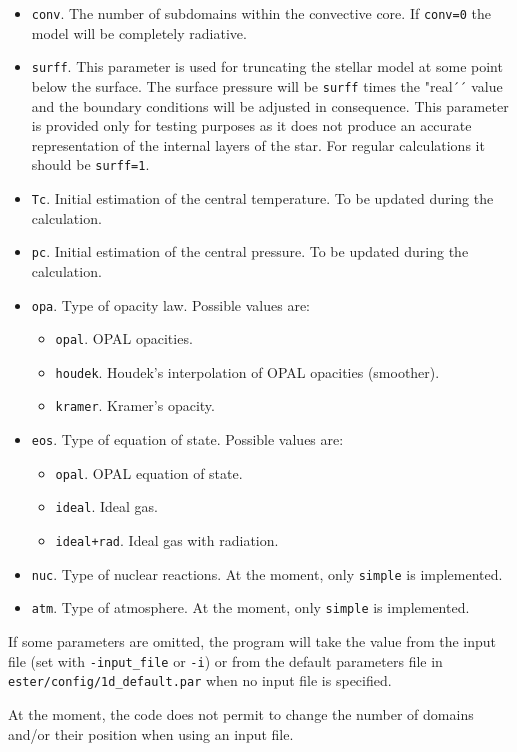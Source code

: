\begin{itemize}
$$\begin{array}{ll}
\end{array}\right.$$
If there is no convective core, this parameter is ignored.
\item {\tt conv}. The number of subdomains within the convective core. If {\tt conv=0} the
model will be completely radiative.
\item {\tt surff}. This parameter is used for truncating the stellar model at some point 
below the surface. The surface pressure will be {\tt surff} times the "real´´ value and
the boundary conditions will be adjusted in consequence. This parameter is provided only for
testing purposes as it does not produce an accurate representation of the internal layers
of the star. For regular calculations it should be {\tt surff=1}.
\item {\tt Tc}. Initial estimation of the central temperature. To be updated during the
calculation.
\item {\tt pc}. Initial estimation of the central pressure. To be updated during the
calculation.
\item {\tt opa}. Type of opacity law. Possible values are:
\begin{itemize}
\item {\tt opal}. OPAL opacities.
\item {\tt houdek}. Houdek's interpolation of OPAL opacities (smoother).
\item {\tt kramer}. Kramer's opacity.
\end{itemize}
\item {\tt eos}. Type of equation of state. Possible values are:
\begin{itemize}
\item {\tt opal}. OPAL equation of state.
\item {\tt ideal}. Ideal gas.
\item {\tt ideal+rad}. Ideal gas with radiation.
\end{itemize}
\item {\tt nuc}. Type of nuclear reactions. At the moment, only {\tt simple} is implemented.
\item {\tt atm}. Type of atmosphere. At the moment, only {\tt simple} is implemented.
\end{itemize}
If some parameters are omitted, the program will take the value from the input file (set with
{\tt -input\_file} or {\tt -i}) or from the default parameters file in 
{\tt ester/config/1d\_default.par} when no input file is specified.

At the moment, the code does not permit to change the number of domains and/or their position
when using an input file.

